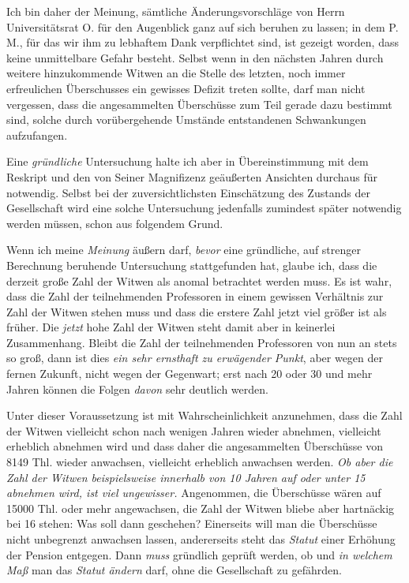 \par{}
Ich bin daher der Meinung, sämtliche Änderungsvorschläge von Herrn Universitätsrat O. für den Augenblick ganz auf sich beruhen zu lassen; in dem P. M., für das wir ihm zu lebhaftem Dank verpflichtet sind, ist gezeigt worden, dass keine unmittelbare Gefahr besteht. Selbst wenn in den nächsten Jahren durch weitere hinzukommende Witwen an die Stelle des letzten, noch immer erfreulichen Überschusses ein gewisses Defizit treten sollte, darf man nicht vergessen, dass die angesammelten Überschüsse zum Teil gerade dazu bestimmt sind, solche durch vorübergehende Umstände entstandenen Schwankungen aufzufangen.

Eine \textit{gründliche} Untersuchung halte ich aber in Übereinstimmung mit dem Reskript und den von Seiner Magnifizenz geäußerten Ansichten durchaus für notwendig. Selbst bei der zuversichtlichsten Einschätzung des Zustands der Gesellschaft wird eine solche Untersuchung jedenfalls zumindest später notwendig werden müssen, schon aus folgendem Grund.

Wenn ich meine \textit{Meinung} äußern darf, \textit{bevor} eine gründliche, auf strenger Berechnung beruhende Untersuchung stattgefunden hat, glaube ich, dass die derzeit große Zahl der Witwen als anomal betrachtet werden muss. Es ist wahr, dass die Zahl der teilnehmenden Professoren in einem gewissen Verhältnis zur Zahl der Witwen stehen muss und dass die erstere Zahl jetzt viel größer ist als früher. Die \textit{jetzt} hohe Zahl der Witwen steht damit aber in keinerlei Zusammenhang. Bleibt die Zahl der teilnehmenden Professoren von nun an stets so groß, dann ist dies \textit{ein sehr ernsthaft zu erwägender Punkt}, aber wegen der fernen Zukunft, nicht wegen der Gegenwart; erst nach 20 oder 30 und mehr Jahren können die Folgen \textit{davon} sehr deutlich werden.

Unter dieser Voraussetzung ist mit Wahrscheinlichkeit anzunehmen, dass die Zahl der Witwen vielleicht schon nach wenigen Jahren wieder abnehmen, vielleicht erheblich abnehmen wird und dass daher die angesammelten Überschüsse von 8149 Thl. wieder anwachsen, vielleicht erheblich anwachsen werden. \textit{Ob aber die Zahl der Witwen beispielsweise innerhalb von \textup{10} Jahren auf oder unter \textup{15} abnehmen wird, ist viel ungewisser.} Angenommen, die Überschüsse wären auf 15000 Thl. oder mehr angewachsen, die Zahl der Witwen bliebe aber hartnäckig bei 16 stehen: Was soll dann geschehen? Einerseits will man die Überschüsse nicht unbegrenzt anwachsen lassen, andererseits steht das \textit{Statut} einer Erhöhung der Pension entgegen. Dann \textit{muss} gründlich geprüft werden, ob und \textit{in welchem Maß} man das \textit{Statut ändern} darf, ohne die Gesellschaft zu gefährden.

